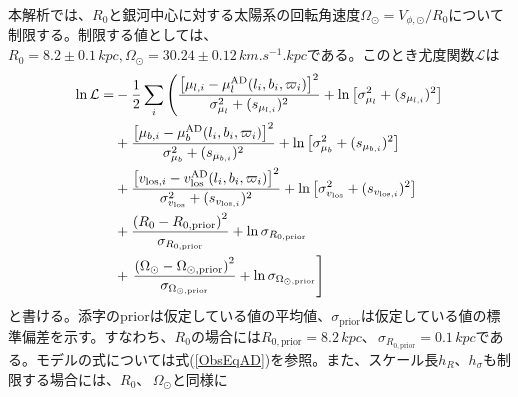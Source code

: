 本解析では、$R_0$と銀河中心に対する太陽系の回転角速度$\Omega_{\odot}=V_{\phi,\odot}/R_0$について制限する。制限する値としては、$R_0=8.2\pm0.1\,\si{kpc},\Omega_{\odot}=30.24\pm0.12\,\si{km.s^{-1}.kpc}$である。このとき尤度関数$\mathcal{L}$は
\begin{align}
\begin{aligned}
	\ln \mathcal{L} =& -\frac{1}{2}\sum_i \left(\frac{\left[\mu_{l,i} - \mu_l^{\mathrm{AD}}(l_i,b_i,\varpi_i)\right]^2}{\sigma_{\mu_l}^2 + (s_{\mu_{l,i}})^2}  + {\rm ln}\left[\sigma_{\mu_l}^2 + (s_{\mu_{l,i}})^2\right] \right. \\
	&+ \frac{\left[\mu_{b,i} - \mu_b^{\mathrm{AD}}(l_i,b_i,\varpi_i)\right]^2}{\sigma_{\mu_b}^2 + (s_{\mu_{b,i}})^2}  + {\rm ln}\left[\sigma_{\mu_b}^2 + (s_{\mu_{b,i}})^2\right] \\
	&+ \frac{\left[v_{\mathrm{los},i} - v^{\mathrm{AD}}_{\mathrm{los}}(l_i,b_i,\varpi_i)\right]^2}{\sigma_{v_{\mathrm{los}}}^2 + (s_{v_{\mathrm{los},i}})^2} + {\rm ln}\left[\sigma_{v_{\mathrm{los}}}^2 + (s_{v_{\mathrm{los},i}})^2\right]\\
	&+ \frac{\left(R_0 - R_{0,\mathrm{prior}}\right)^2}{\sigma_{R_{0,\mathrm{prior}}}} + \ln{\sigma_{R_{0,\mathrm{prior}}}}\\
	&+ \left. \frac{\left(\Omega_{\odot} - \Omega_{\odot,\mathrm{prior}}\right)^2}{\sigma_{\Omega_{\odot,\mathrm{prior}}}} + \ln{\sigma_{\Omega_{\odot,\mathrm{prior}}}} \right]
\end{aligned}
\end{align}
と書ける。添字のpriorは仮定している値の平均値、$\sigma_{\mathrm{prior}}$は仮定している値の標準偏差を示す。すなわち、$R_0$の場合には$R_{0,\mathrm{prior}} = 8.2\,\si{kpc}、\,\sigma_{R_{0,\mathrm{prior}}}=0.1\,\si{kpc}$である。モデルの式については式(\ref{ObsEqAD})を参照。また、スケール長$h_R、h_{\sigma}$も制限する場合には、$R_0、\,\Omega_{\odot}$と同様に
